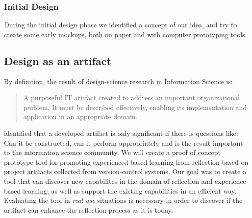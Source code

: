 \subsubsection{Initial Design}
During the initial design phase we identified a concept of our idea, and try to create some early mockups, both on paper and with computer prototyping tools. 




\subsection{Design as an artifact}
By definition, the result of design-science research in Information Science is:
\begin{quote}
A purposeful IT artifact created to address an important organizational problem. It must be described effectively, enabling its implementation and application in an appropriate domain.
\end{quote}
\cite{Markus et al. 2002} identified that a developed artifact is only significant if there is questions like: Can it be constructed, can it perform appropriately and is the result important to the information science community. 
We will create a proof of concept prototype tool for promoting experienced-based learning from reflection based on project artifacts collected from version-control systems. Our goal was to create a tool that can discover new capabilites in the domain of reflection and experience-based learning, as well as support the existing capabilities in an efficient way. Evaluating the tool in \emph{real use} situations is necessary in order to discover if the artifact can enhance the reflection process as it is today. 

